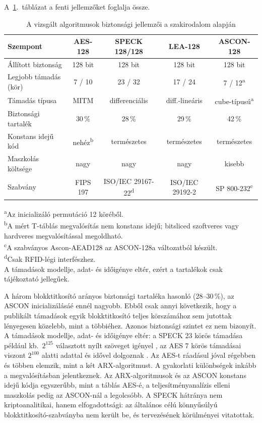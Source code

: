 \documentclass[a4paper,12pt]{report}
\theoremstyle{definition}
\theoremstyle{remark}
\begin{document}
A~\ref{table:security_compare}.~táblázat a fenti jellemzőket foglalja össze.

\begin{table}[h!]
\centering
\caption{A vizsgált algoritmusok biztonsági jellemzői a szakirodalom alapján}
\label{table:security_compare}
\footnotesize
\vspace{.2 cm}
\setlength{\tabcolsep}{3.5pt}
\begin{tabular}{lcccc}
\hline
\textbf{Szempont} & \textbf{AES-128} & \textbf{SPECK 128/128} & \textbf{LEA-128} & \textbf{ASCON-128} \\
\hline
Állított biztonság & 128 bit & 128 bit & 128 bit & 128 bit \\
Legjobb támadás (kör) & 7 / 10 & 23 / 32 & 17 / 24 & 7 / 12\textsuperscript{a} \\
Támadás típusa & MITM & differenciális & diff.-lineáris & cube-típusú\textsuperscript{a} \\
Biztonsági tartalék & 30\,\% & 28\,\% & 29\,\% & 42\,\% \\
Konstans idejű kód & nehéz\textsuperscript{b} & természetes & természetes & természetes \\
Maszkolás költsége & nagy & nagy & nagy & kisebb \\
Szabvány & FIPS 197 & ISO/IEC 29167-22\textsuperscript{d} & ISO/IEC 29192-2 & SP 800-232\textsuperscript{c} \\
\hline
\end{tabular}
\begin{flushleft}
\footnotesize
\textsuperscript{a}Az inicializáló permutáció 12 köréből.\\
\textsuperscript{b}A mért T-táblás megvalósítás nem konstans idejű; bitsliced szoftveres vagy hardveres megvalósítással megoldható.\\
\textsuperscript{c}A szabványos Ascon-AEAD128 az ASCON-128a változatból készült.\\
\textsuperscript{d}Csak RFID-légi interfészhez.\\
A támadások modellje, adat- és időigénye eltér, ezért a tartalékok csak tájékoztató jellegűek.
\end{flushleft}
\end{table}

A három blokktitkosító arányos biztonsági tartaléka hasonló (28--30\,\%), az ASCON inicializálásáé ennél nagyobb. Ebből csak annyi következik, hogy a publikált támadások egyik blokktitkosító teljes körszámához sem jutottak lényegesen közelebb, mint a többiéhez. Azonos biztonsági szintet ez nem bizonyít. A támadások modellje, adat- és időigénye eltér: a SPECK 23 körös támadása például kb.\ $2^{125}$ választott nyílt szöveget igényel \cite{Song2016}, az AES 7 körös támadásai viszont $2^{100}$ alatti adattal és idővel dolgoznak \cite{Derbez2013}. Az AES-t ráadásul jóval régebben és többen elemzik, mint a két ARX-algoritmust. A gyakorlati különbségek inkább a megvalósításban jelentkeznek. Az ARX-algoritmusok és az ASCON konstans idejű kódja egyszerűbb, mint a táblás AES-é, a teljesítményanalízis elleni maszkolás pedig az ASCON-nál a legolcsóbb. A SPECK hátránya nem kriptoanalitikai, hanem elfogadottsági: az általános célú könnyűsúlyú blokktitkosító-szabványba nem került be, és tervezésének körülményei vitatottak.
\end{document}
